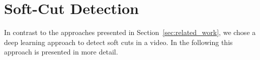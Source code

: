 \section{Soft-Cut Detection}
\label{sec:soft_cut}

In contrast to the approaches presented in Section~\ref{sec:related_work}, we chose a deep learning approach to detect soft cuts in a video.
In the following this approach is presented in more detail.




